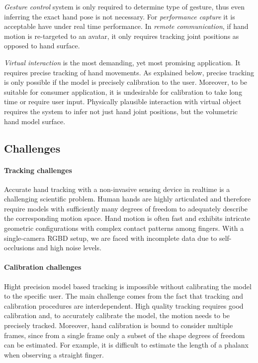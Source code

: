 \textit{Gesture control} system is only required to determine type of gesture, thus even inferring the exact hand pose is not necessary. For \textit{performance capture} it is acceptable have under real time performance. In \textit{remote communication}, if hand motion is re-targeted to an avatar, it only requires tracking joint positions as opposed to hand surface.

\textit{Virtual interaction} is the most demanding, yet most promising application. It requires precise tracking of hand movements. As explained below, precise tracking is only possible if the model is precisely calibration to the user. Moreover, to be suitable for consumer application, it is undesirable for calibration to take long time or require user input. Physically plausible interaction with virtual object requires the system to infer not just hand joint positions, but the volumetric hand model surface.

\subsection*{Challenges}

\paragraph{Tracking challenges} Accurate hand tracking with a non-invasive sensing device in realtime is a challenging scientific problem. Human hands are highly articulated and therefore require models with sufficiently many degrees of freedom to adequately describe the corresponding motion space. Hand motion is often fast and exhibits intricate geometric configurations with complex contact patterns among fingers. With a single-camera RGBD setup, we are faced with incomplete data due to self-occlusions and high noise levels.  

\paragraph{Calibration challenges} Hight precision model based tracking is impossible without calibrating the model to the specific user. The main challenge comes from the fact that tracking and calibration procedures are interdependent. High quality tracking requires good calibration and, to accurately calibrate the model, the motion needs to be precisely tracked. Moreover, hand calibration is bound to consider multiple frames, since from a single frame only a subset of the shape degrees of freedom can be estimated. For example, it is difficult to estimate the length of a phalanx when observing a straight finger.

